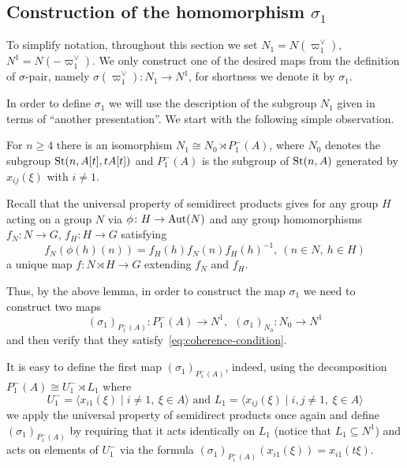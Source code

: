 
\subsection{Construction of the homomorphism $\sigma_1$}\label{subsec:construction-sigma}
To simplify notation, throughout this section we set $N_1 = N(\varpi_1^\vee),$ $N^1 = N(-\varpi_1^\vee)$.
We only construct one of the desired maps from the definition of $\sigma$-pair, namely $\sigma(\varpi_1^\vee) \colon N_1 \to N^1$,
for shortness we denote it by $\sigma_1$.

In order to define $\sigma_1$ we will use the description of the subgroup $N_1$ given in terms of ``another presentation''.
We start with the following simple observation.
\begin{lemma}
    \label{lem:n1-decomp} For $n\geq 4$ there is an isomorphism $N_1 \cong N_{0} \rtimes P_1^-(A)$,
    where $N_{0}$ denotes the subgroup $\operatorname{St}(n, A[t], tA[t])$ and $P_1^-(A)$ is the subgroup of $\operatorname{St}(n, A)$ generated by $x_{ij}(\xi)$ with $i\neq 1$.
\end{lemma}

Recall that the universal property of semidirect products gives for any group $H$ acting on a group $N$ via $\phi \colon H \to \operatorname{Aut}(N)$
and any group homomorphisms $f_N\colon N \to G$, $f_H\colon H \to G$ satisfying
\begin{equation}
    \label{eq:coherence-condition} f_N(\phi(h)(n)) = f_H(h) f_N(n) f_H(h)^{-1},\ (n\in N,\ h\in H)
\end{equation}
a unique map $f\colon N \rtimes H \to G$ extending $f_N$ and $f_H$.

Thus, by the above lemma, in order to construct the map $\sigma_1$ we need to construct two maps
\[ (\sigma_1)_{P_1^-(A)} \colon P_1^-(A) \to N^1, \ \ (\sigma_1)_{N_{0}} \colon N_{0} \to N^1\]
and then verify that they satisfy~\eqref{eq:coherence-condition}.

It is easy to define the first map $(\sigma_1)_{P_1^-(A)}$, indeed, using the decomposition $P_1^-(A) \cong U^-_1 \rtimes L_1$ where %
\[U^-_1 = \langle x_{i1}(\xi) \mid i\neq 1,\ \xi\in A \rangle \text{ and } L_1 = \langle x_{ij}(\xi) \mid i,  j \neq 1,\ \xi\in A\rangle \]
we apply the universal property of semidirect products once again
and define $(\sigma_1)_{P_1^-(A)}$ by requiring that it acts identically on $L_1$ (notice that $L_1 \subseteq N^1$) %
and acts on elements of $U^-_1$ via the formula $(\sigma_1)_{P_1^-(A)}(x_{i1}(\xi))= x_{i1}(t\xi)$.

